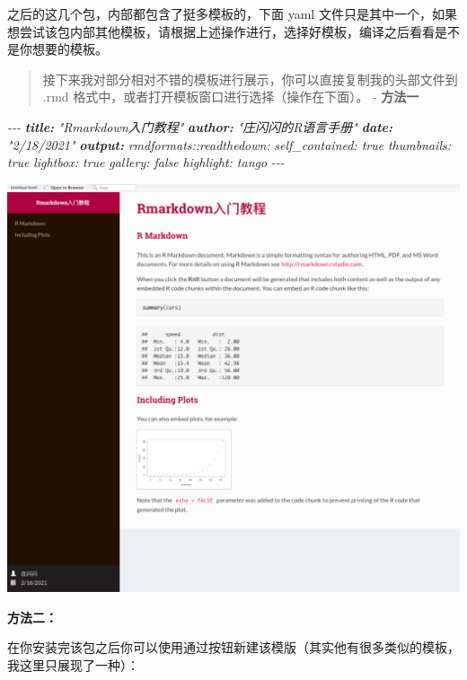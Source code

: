 \documentclass[
]{book}
\newenvironment{Shaded}{\begin{snugshade}}{\end{snugshade}}
\newcommand{\AnnotationTok}[1]{\textcolor[rgb]{0.56,0.35,0.01}{\textbf{\textit{#1}}}}
\newcommand{\CommentTok}[1]{\textcolor[rgb]{0.56,0.35,0.01}{\textit{#1}}}
\begin{document}
之后的这几个包，内部都包含了挺多模板的，下面 yaml
文件只是其中一个，如果想尝试该包内部其他模板，请根据上述操作进行，选择好模板，编译之后看看是不是你想要的模板。

\begin{quote}
接下来我对部分相对不错的模板进行展示，你可以直接复制我的头部文件到
.rmd 格式中，或者打开模板窗口进行选择（操作在下面）。 - \textbf{方法一}
\end{quote}

\begin{Shaded}
\begin{Highlighting}[]
\CommentTok{{-}{-}{-}}
\AnnotationTok{title:}\CommentTok{ "Rmarkdown入门教程"}
\AnnotationTok{author:}\CommentTok{ "庄闪闪的R语言手册"}
\AnnotationTok{date:}\CommentTok{ "2/18/2021"}
\AnnotationTok{output:}
\CommentTok{  rmdformats::readthedown:}
\CommentTok{    self\_contained: true}
\CommentTok{    thumbnails: true}
\CommentTok{    lightbox: true}
\CommentTok{    gallery: false}
\CommentTok{    highlight: tango}
\CommentTok{{-}{-}{-}}
\end{Highlighting}
\end{Shaded}

\includegraphics{images/paste-49E7FC6A.png}

\textbf{方法二：}

在你安装完该包之后你可以使用通过按钮新建该模版（其实他有很多类似的模板，我这里只展现了一种）：
\end{document}
